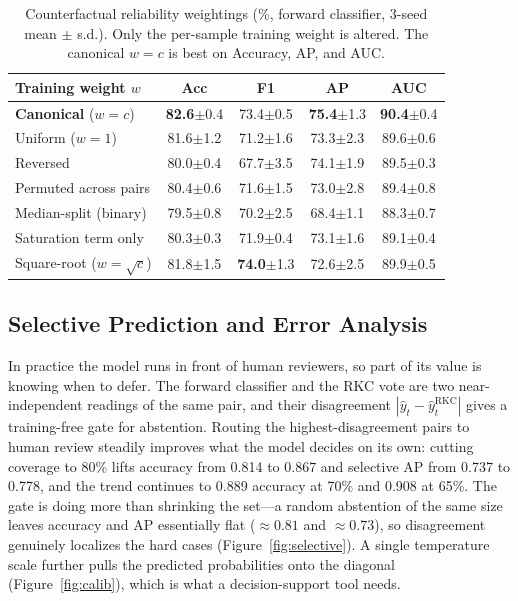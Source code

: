 \documentclass[letterpaper]{article}
\newcommand{\best}[1]{\textbf{#1}}
\newcommand{\std}[1]{{\scriptsize$\pm$#1}}
\begin{document}
\begin{table}[t]
\centering\small
\setlength{\tabcolsep}{5pt}
\begin{tabular}{lcccc}
\toprule
Training weight $w$ & Acc & F1 & AP & AUC \\
\midrule
\textbf{Canonical} ($w{=}c$) & \best{82.6}\std{0.4} & 73.4\std{0.5} & \best{75.4}\std{1.3} & \best{90.4}\std{0.4} \\
Uniform ($w{=}1$) & 81.6\std{1.2} & 71.2\std{1.6} & 73.3\std{2.3} & 89.6\std{0.6} \\
Reversed & 80.0\std{0.4} & 67.7\std{3.5} & 74.1\std{1.9} & 89.5\std{0.3} \\
Permuted across pairs & 80.4\std{0.6} & 71.6\std{1.5} & 73.0\std{2.8} & 89.4\std{0.8} \\
Median-split (binary) & 79.5\std{0.8} & 70.2\std{2.5} & 68.4\std{1.1} & 88.3\std{0.7} \\
Saturation term only & 80.3\std{0.3} & 71.9\std{0.4} & 73.1\std{1.6} & 89.1\std{0.4} \\
Square-root ($w{=}\sqrt c$) & 81.8\std{1.5} & \best{74.0}\std{1.3} & 72.6\std{2.5} & 89.9\std{0.5} \\
\bottomrule
\end{tabular}
\caption{Counterfactual reliability weightings (\%, forward classifier, 3-seed mean $\pm$ s.d.). Only the per-sample training weight is altered. The canonical $w{=}c$ is best on Accuracy, AP, and AUC.}
\label{tab:rw}
\end{table}

\subsection{Selective Prediction and Error Analysis}

In practice the model runs in front of human reviewers, so part of its value is knowing when to defer. The forward classifier and the RKC vote are two near-independent readings of the same pair, and their disagreement $|\hat y_t-\hat y^{\mathrm{RKC}}_t|$ gives a training-free gate for abstention. Routing the highest-disagreement pairs to human review steadily improves what the model decides on its own: cutting coverage to 80\% lifts accuracy from 0.814 to 0.867 and selective AP from 0.737 to 0.778, and the trend continues to 0.889 accuracy at 70\% and 0.908 at 65\%. The gate is doing more than shrinking the set---a random abstention of the same size leaves accuracy and AP essentially flat ($\approx0.81$ and $\approx0.73$), so disagreement genuinely localizes the hard cases (Figure~\ref{fig:selective}). A single temperature scale further pulls the predicted probabilities onto the diagonal (Figure~\ref{fig:calib}), which is what a decision-support tool needs.
\end{document}
